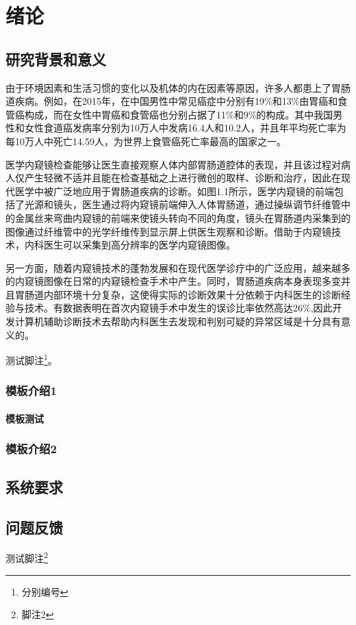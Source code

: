 \chapter{绪论}
\section{研究背景和意义}
  由于环境因素和生活习惯的变化以及机体的内在因素等原因，许多人都患上了胃肠道疾病。例如，在2015年，在中国男性中常见癌症中分别有19\%和13\%由胃癌和食管癌构成，而在女性中胃癌和食管癌也分别占据了11\%和9\%的构成。其中我国男性和女性食道癌发病率分别为10万人中发病16.4人和10.2人，并且年平均死亡率为每10万人中死亡14.59人，为世界上食管癌死亡率最高的国家之一。\par
  医学内窥镜检查能够让医生直接观察人体内部胃肠道腔体的表现，并且该过程对病人仅产生轻微不适并且能在检查基础之上进行微创的取样、诊断和治疗，因此在现代医学中被广泛地应用于胃肠道疾病的诊断。如图1.1所示，医学内窥镜的前端包括了光源和镜头，医生通过将内窥镜前端伸入人体胃肠道，通过操纵调节纤维管中的金属丝来弯曲内窥镜的前端来使镜头转向不同的角度，镜头在胃肠道内采集到的图像通过纤维管中的光学纤维传到显示屏上供医生观察和诊断。借助于内窥镜技术，内科医生可以采集到高分辨率的医学内窥镜图像。\par
  另一方面，随着内窥镜技术的蓬勃发展和在现代医学诊疗中的广泛应用，越来越多的内窥镜图像在日常的内窥镜检查手术中产生。同时，胃肠道疾病本身表现多变并且胃肠道内部环境十分复杂，这使得实际的诊断效果十分依赖于内科医生的诊断经验与技术。有数据表明在首次内窥镜手术中发生的误诊比率依然高达26\%\cite{cheng2008clinical},因此开发计算机辅助诊断技术去帮助内科医生去发现和判别可疑的异常区域是十分具有意义的。
  
  
测试脚注\footnote{分别编号}。


\subsection{模板介绍1}

\subsubsection{模板测试}

\subsection{模板介绍2}

\section{系统要求}

\section{问题反馈}
测试脚注\footnote{脚注2}
